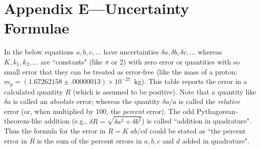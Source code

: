 \newapp
\newpage
\section*{Appendix E---Uncertainty Formulae}
In the below equations %
$a,b,c,\ldots$ have uncertainties $\delta a,\delta b,\delta c,\ldots$ 
whereas %
$K, k_1,k_2,\ldots$ are ``constants" (like $\pi$ or 2) with
zero error or quantities with so small error that they can be treated
as error-free (like the mass of a proton: $m_p=(1.67262158\pm.00000013)\times 10^{-27}$~kg).
This table reports the error in a calculated quantity $R$ (which is assumed to be positive).  
Note that a quantity like
$\delta a$ is called an {\em absolute} error; whereas the quantity
$\delta a/a$ is called the {\em relative} error (or, when multiplied by
100, the {\em percent} error).  The odd Pythagorean-theorem-like addition
(e.g., $\delta R= \sqrt{\delta a^2 + \delta b^2}$) is called ``addition in
quadrature".  Thus the formula for the error in $R=K\;{ab/cd}$ could be stated as
``the percent error in $R$ is the sum of the percent errors in $a,b,c$ and $d$ added
in quadrature".\label{eq:E.error}

